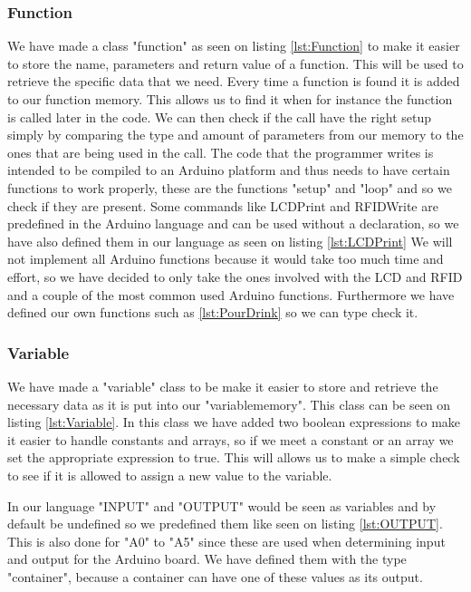 \subsubsection{Function}
\label{sec:Function}
We have made a class "function" as seen on listing \ref{lst:Function} to make it easier to store the name, parameters and return value of a function. This will be used to retrieve the specific data that we need. Every time a function is found it is added to our function memory. This allows us to find it when for instance the function is called later in the code. We can then check if the call have the right setup simply by comparing the type and amount of parameters from our memory to the ones that are being used in the call.
The code that the programmer writes is intended to be compiled to an Arduino platform and thus needs to have certain functions to work properly, these are the functions "setup" and "loop" and so we check if they are present. Some commands like LCDPrint and RFIDWrite are predefined in the Arduino language and can be used without a declaration, so we have also defined them in our language as seen on listing \ref{lst:LCDPrint}
We will not implement all Arduino functions because it would take too much time and effort, so we have decided to only take the ones involved with the LCD and RFID and a couple of the most common used Arduino functions. Furthermore we have defined our own functions such as \ref{lst:PourDrink} so we can type check it.

\subsubsection{Variable}
\label{sec:Variable}
We have made a "variable" class to be make it easier to store and retrieve the necessary data as it is put into our "variablememory". This class can be seen on listing \ref{lst:Variable}. In this class we have added two boolean expressions to make it easier to handle constants and arrays, so if we meet a constant or an array we set the appropriate expression to true. This will allows us to make a simple check to see if it is allowed to assign a new value to the variable.

In our language "INPUT" and "OUTPUT" would be seen as variables and by default be undefined so we predefined them like seen on listing \ref{lst:OUTPUT}. This is also done for "A0" to "A5" since these are used when determining input and output for the Arduino board. We have defined them with the type "container", because a container can have one of these values as its output.

